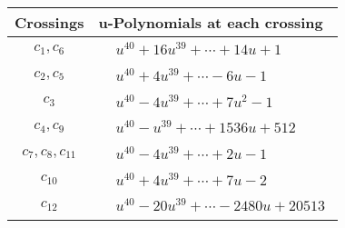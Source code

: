 \documentclass[1p]{elsarticle_modified}
\theoremstyle{definition}
\begin{document}
\begin{tabular}{m{50pt}|m{274pt}}
Crossings & \hspace{64pt}u-Polynomials at each crossing \\
\hline $$\begin{aligned}c_{1},c_{6}\end{aligned}$$&$\begin{aligned}
&u^{40}+16 u^{39}+\cdots+14 u+1
\end{aligned}$\\
\hline $$\begin{aligned}c_{2},c_{5}\end{aligned}$$&$\begin{aligned}
&u^{40}+4 u^{39}+\cdots-6 u-1
\end{aligned}$\\
\hline $$\begin{aligned}c_{3}\end{aligned}$$&$\begin{aligned}
&u^{40}-4 u^{39}+\cdots+7 u^2-1
\end{aligned}$\\
\hline $$\begin{aligned}c_{4},c_{9}\end{aligned}$$&$\begin{aligned}
&u^{40}- u^{39}+\cdots+1536 u+512
\end{aligned}$\\
\hline $$\begin{aligned}c_{7},c_{8},c_{11}\end{aligned}$$&$\begin{aligned}
&u^{40}-4 u^{39}+\cdots+2 u-1
\end{aligned}$\\
\hline $$\begin{aligned}c_{10}\end{aligned}$$&$\begin{aligned}
&u^{40}+4 u^{39}+\cdots+7 u-2
\end{aligned}$\\
\hline $$\begin{aligned}c_{12}\end{aligned}$$&$\begin{aligned}
&u^{40}-20 u^{39}+\cdots-2480 u+20513
\end{aligned}$\\
\hline
\end{tabular}\\~\\
\newpage\renewcommand{\arraystretch}{1}
\end{document}
